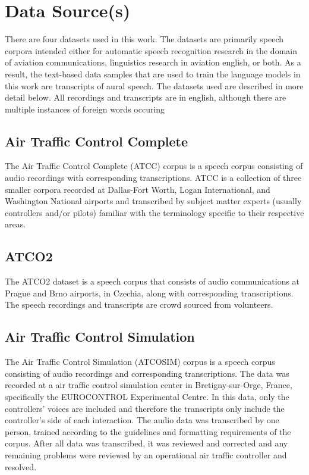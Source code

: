 \documentclass[12pt]{article}
\begin{document}
\section{Data Source(s)}\label{sec:data_source}
There are four datasets used in this work. The datasets are primarily speech corpora intended either for automatic speech recognition
research in the domain of aviation communications, linguistics research in aviation english, or both. As a result, the text-based data
samples that are used to train the language models in this work are transcripts of aural speech. The datasets used are described in more
detail below. All recordings and transcripts are in english, although there are multiple instances of foreign words occuring

\subsection{Air Traffic Control Complete}
The Air Traffic Control Complete (ATCC) corpus is a speech corpus consisting of audio recordings with corresponding transcriptions.
ATCC is a collection of three smaller corpora recorded at Dallas-Fort Worth, Logan International, and Washington National airports and
transcribed by subject matter experts (usually controllers and/or pilots) familiar with the terminology specific to their respective
areas\cite{godfrey_air_1994}.

\subsection{ATCO2}
The ATCO2 dataset is a speech corpus that consists of audio communications at Prague and Brno airports, in Czechia, along with corresponding
transcriptions. The speech recordings and transcripts are crowd sourced from volunteers\cite{szoke_detecting_2021}.


\subsection{Air Traffic Control Simulation}
The Air Traffic Control Simulation (ATCOSIM) corpus is a speech corpus consisting of audio recordings and corresponding transcriptions.
The data was recorded at a air traffic control simulation center in Bretigny-sur-Orge, France, specifically the EUROCONTROL Experimental Centre.
In this data, only the controllers' voices are included and therefore the transcripts only include the controller's side of each interaction.
The audio data was transcribed by one person, trained according to the guidelines and formatting requirements of the corpus. After all data was
transcribed, it was reviewed and corrected and any remaining problems were reviewed by an operational air traffic controller and
resolved\cite{hofbauer_atcosim_2008}.
\end{document}
